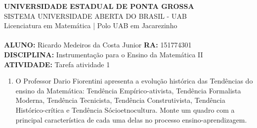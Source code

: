 \documentclass[a4paper, 12pt]{article}
\begin{document}
\textbf{UNIVERSIDADE ESTADUAL DE PONTA GROSSA} \\
SISTEMA UNIVERSIDADE ABERTA DO BRASIL - UAB \\
Licenciatura em Matemática | Polo UAB em Jacarezinho \\ \\
\textbf{ALUNO:} Ricardo Medeiros da Costa Junior \textbf{RA:} 151774301 \\
\textbf{DISCIPLINA:} Instrumentação para o Ensino da Matemática II \\
\textbf{ATIVIDADE:} Tarefa atividade 1

\begin{enumerate}
\item O Professor Dario Fiorentini apresenta a evolução histórica das Tendências do ensino da Matemática: Tendência Empírico-ativista, Tendência Formalista Moderna, Tendência Tecnicista, Tendência Construtivista, Tendência Histórico-crítica e Tendência Sócioetnocultura. Monte um quadro com a principal característica de cada uma delas no processo ensino-aprendizagem. \\ \\


\end{enumerate}
\end{document}
